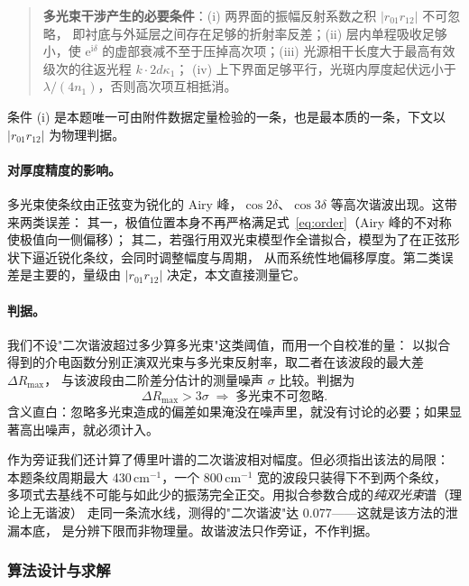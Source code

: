 \documentclass[12pt]{article}
\begin{document}
\begin{quote}
\textbf{多光束干涉产生的必要条件}：\;(i) 两界面的振幅反射系数之积 $|r_{01}r_{12}|$ 不可忽略，
即衬底与外延层之间存在足够的折射率反差；(ii) 层内单程吸收足够小，使 $\mathrm{e}^{\mathrm{i}\delta}$
的虚部衰减不至于压掉高次项；(iii) 光源相干长度大于最高有效级次的往返光程 $k\cdot2d\kappa_1$；
(iv) 上下界面足够平行，光斑内厚度起伏远小于 $\lambda/(4n_1)$，否则高次项互相抵消。
\end{quote}

条件 (i) 是本题唯一可由附件数据定量检验的一条，也是最本质的一条，下文以 $|r_{01}r_{12}|$ 为物理判据。

\paragraph{对厚度精度的影响。}
多光束使条纹由正弦变为锐化的 Airy 峰，$\cos2\delta$、$\cos3\delta$ 等高次谐波出现。这带来两类误差：
其一，极值位置本身不再严格满足式~\eqref{eq:order}（Airy 峰的不对称使极值向一侧偏移）；
其二，若强行用双光束模型作全谱拟合，模型为了在正弦形状下逼近锐化条纹，会同时调整幅度与周期，
从而系统性地偏移厚度。第二类误差是主要的，量级由 $|r_{01}r_{12}|$ 决定，本文直接测量它。

\paragraph{判据。}
我们不设"二次谐波超过多少算多光束"这类阈值，而用一个自校准的量：
以拟合得到的介电函数分别正演双光束与多光束反射率，取二者在该波段的最大差 $\Delta R_{\max}$，
与该波段由二阶差分估计的测量噪声 $\sigma$ 比较。判据为
\begin{equation}
  \Delta R_{\max}>3\sigma \;\Longrightarrow\; 多光束不可忽略 .
\end{equation}
含义直白：忽略多光束造成的偏差如果淹没在噪声里，就没有讨论的必要；如果显著高出噪声，就必须计入。

作为旁证我们还计算了傅里叶谱的二次谐波相对幅度。但必须指出该法的局限：
本题条纹周期最大 430\,cm$^{-1}$，一个 800\,cm$^{-1}$ 宽的波段只装得下不到两个条纹，
多项式去基线不可能与如此少的振荡完全正交。用拟合参数合成的\emph{纯双光束}谱（理论上无谐波）
走同一条流水线，测得的"二次谐波"达 0.077——这就是该方法的泄漏本底，
是分辨下限而非物理量。故谐波法只作旁证，不作判据。

\subsubsection{算法设计与求解}
\end{document}
